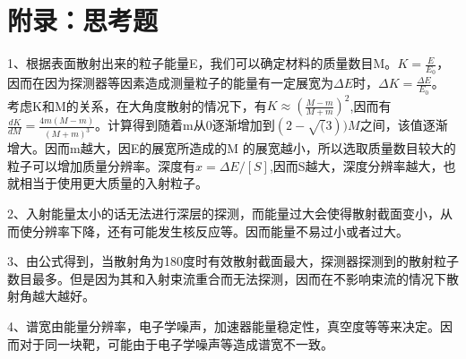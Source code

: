 \documentclass[a4paper,10.0pt,twoside]{npr}
\begin{document}
\newpage


\section*{附录：思考题}
1、根据表面散射出来的粒子能量E，我们可以确定材料的质量数目M。$K=\frac{E}{E_0}$，因而在因为探测器等因素造成测量粒子的能量有一定展宽为$\Delta E$时，$\Delta K=\frac{\Delta E}{E_0}$。 考虑K和M的关系，在大角度散射的情况下，有$K\approx(\frac{M-m}{M+m})^2$,因而有$\frac{dK}{dM}=\frac{4m(M-m)}{(M+m)^3}$。计算得到随着m从0逐渐增加到$(2-\sqrt(3))M$之间，该值逐渐增大。因而m越大，因E的展宽所造成的M
的展宽越小，所以选取质量数目较大的粒子可以增加质量分辨率。深度有$x=\Delta E/[S]$,因而S越大，深度分辨率越大，也就相当于使用更大质量的入射粒子。

2、入射能量太小的话无法进行深层的探测，而能量过大会使得散射截面变小，从而使分辨率下降，还有可能发生核反应等。因而能量不易过小或者过大。

3、由公式得到，当散射角为180度时有效散射截面最大，探测器探测到的散射粒子数目最多。但是因为其和入射束流重合而无法探测，因而在不影响束流的情况下散射角越大越好。

4、谱宽由能量分辨率，电子学噪声，加速器能量稳定性，真空度等等来决定。因而对于同一块靶，可能由于电子学噪声等造成谱宽不一致。

\clearpage
\end{document}
